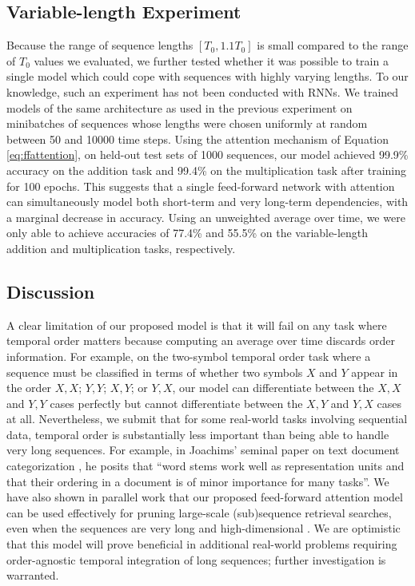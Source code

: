 \documentclass{article} %
\begin{document}
\subsection{Variable-length Experiment}

Because the range of sequence lengths $[T_0, 1.1T_0]$ is small compared to the range of $T_0$ values we evaluated, we further tested whether it was possible to train a single model which could cope with sequences with highly varying lengths.
To our knowledge, such an experiment has not been conducted with RNNs.
We trained models of the same architecture as used in the previous experiment on minibatches of sequences whose lengths were chosen uniformly at random between 50 and 10000 time steps.
Using the attention mechanism of Equation \ref{eq:ffattention}, on held-out test sets of 1000 sequences, our model achieved 99.9\% accuracy on the addition task and 99.4\% on the multiplication task after training for 100 epochs.
This suggests that a single feed-forward network with attention can simultaneously model both short-term and very long-term dependencies, with a marginal decrease in accuracy.
Using an unweighted average over time, we were only able to achieve accuracies of 77.4\% and 55.5\% on the variable-length addition and multiplication tasks, respectively.

\subsection{Discussion}

A clear limitation of our proposed model is that it will fail on any task where temporal order matters because computing an average over time discards order information.
For example, on the two-symbol temporal order task \cite{hochreiter1997long} where a sequence must be classified in terms of whether two symbols $X$ and $Y$ appear in the order $X, X$; $Y, Y$; $X, Y$; or $Y, X$, our model can differentiate between the $X, X$ and $Y, Y$ cases perfectly but cannot differentiate between the $X, Y$ and $Y, X$ cases at all.
Nevertheless, we submit that for some real-world tasks involving sequential data, temporal order is substantially less important than being able to handle very long sequences.
For example, in Joachims' seminal paper on text document categorization \cite{joachims1998text}, he posits that ``word stems work well as representation units and that their ordering in a document is of minor importance for many tasks''.
We have also shown in parallel work that our proposed feed-forward attention model can be used effectively for pruning large-scale (sub)sequence retrieval searches, even when the sequences are very long and high-dimensional \cite{raffel2016pruning}.
We are optimistic that this model will prove beneficial in additional real-world problems requiring order-agnostic temporal integration of long sequences; further investigation is warranted.



\end{document}
